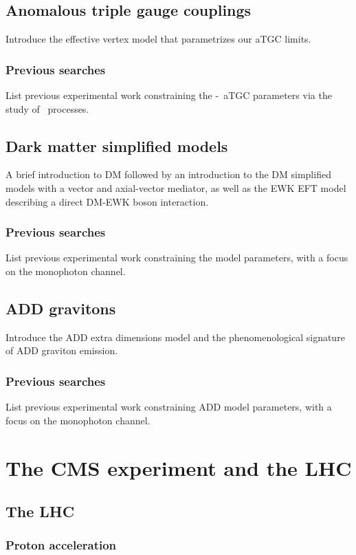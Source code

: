 \documentclass[oneside, letterpaper, 12pt, oldfontcommands]{memoir}
\begin{document}
\section{Anomalous triple gauge couplings} \label{sec:introduction_aTGC}
Introduce the effective vertex model that parametrizes our aTGC limits.
\subsection{Previous searches} \label{sec:introduction_aTGC_previous_searches}
List previous experimental work constraining the \PZ-\Pgamma\ aTGC parameters via the study of \PZ\Pgamma\ processes.

\section{Dark matter simplified models} \label{sec:introduction_dark_matter}
A brief introduction to DM followed by an introduction to the DM simplified models with a vector and axial-vector
mediator, as well as the EWK EFT model describing a direct DM-EWK boson interaction.
\subsection{Previous searches}
List previous experimental work constraining the model parameters, with a focus on the monophoton channel.

\section{ADD gravitons} \label{sec:introduction_ADD}
Introduce the ADD extra dimensions model and the phenomenological signature of ADD graviton emission.
\subsection{Previous searches}
List previous experimental work constraining ADD model parameters, with a focus on the monophoton channel.

\chapter{The CMS experiment and the LHC}
\section{The LHC}
\subsection{Proton acceleration}
\end{document}
